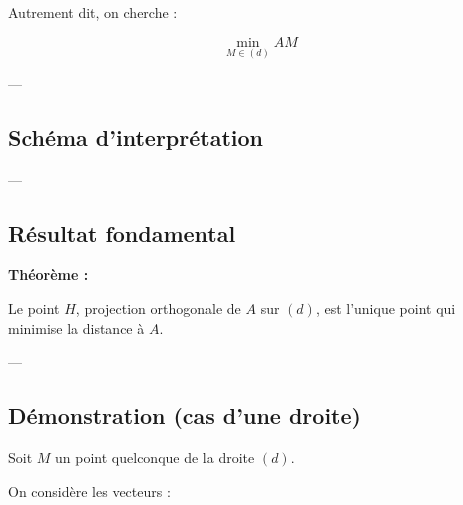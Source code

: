\documentclass[11pt,a4paper]{article}
\begin{document}
\bigskip

Autrement dit, on cherche :

\[
\min_{M \in (d)} AM
\]

---

\subsection{Schéma d’interprétation}

\begin{center}
\end{center}

---

\subsection{Résultat fondamental}

\textbf{Théorème :}

Le point $H$, projection orthogonale de $A$ sur $(d)$, est l’unique point qui minimise la distance à $A$.

---

\subsection{Démonstration (cas d’une droite)}

Soit $M$ un point quelconque de la droite $(d)$.

\bigskip

On considère les vecteurs :
\end{document}
